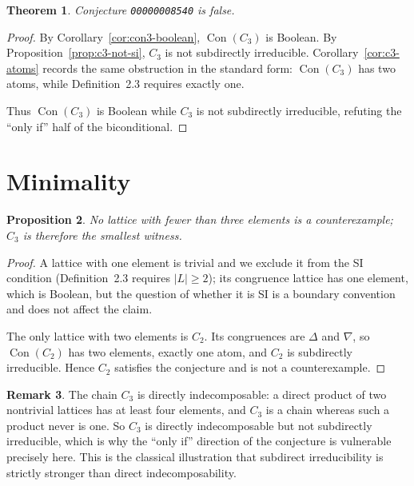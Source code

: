 \documentclass[11pt]{article}
\newtheorem{theorem}{Theorem}
\newtheorem{proposition}[theorem]{Proposition}
\theoremstyle{definition}
\newtheorem{remark}[theorem]{Remark}
\newcommand{\Con}{\operatorname{Con}}
\begin{document}
\begin{theorem}\label{thm:main}
Conjecture \texttt{00000008540} is false.
\end{theorem}

\begin{proof}
By Corollary~\ref{cor:con3-boolean}, $\Con(C_3)$ is Boolean. By
Proposition~\ref{prop:c3-not-si}, $C_3$ is not subdirectly irreducible.
Corollary~\ref{cor:c3-atoms} records the same obstruction in the standard
form: $\Con(C_3)$ has two atoms, while Definition~2.3 requires exactly one.

Thus $\Con(C_3)$ is Boolean while $C_3$ is not subdirectly irreducible,
refuting the ``only if'' half of the biconditional.
\end{proof}

\section{Minimality}

\begin{proposition}\label{prop:minimal}
No lattice with fewer than three elements is a counterexample; $C_3$ is
therefore the smallest witness.
\end{proposition}

\begin{proof}
A lattice with one element is trivial and we exclude it from the SI
condition (Definition~2.3 requires $|L| \ge 2$); its congruence lattice has
one element, which is Boolean, but the question of whether it is SI is a
boundary convention and does not affect the claim.

The only lattice with two elements is $C_2$. Its congruences are $\Delta$ and
$\nabla$, so $\Con(C_2)$ has two elements, exactly one atom, and $C_2$ is
subdirectly irreducible. Hence $C_2$ satisfies the conjecture and is not a
counterexample.
\end{proof}

\begin{remark}
The chain $C_3$ is directly indecomposable: a direct product of two nontrivial
lattices has at least four elements, and $C_3$ is a chain whereas such a
product never is one. So $C_3$ is directly indecomposable but not subdirectly
irreducible, which is why the ``only if'' direction of the conjecture is
vulnerable precisely here. This is the classical illustration that subdirect
irreducibility is strictly stronger than direct indecomposability.
\end{remark}
\end{document}

